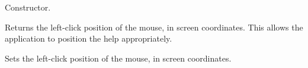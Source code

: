 \label{wxhelpeventctor}


Constructor.

\label{wxhelpeventgetposition}


Returns the left-click position of the mouse, in screen coordinates. This allows
the application to position the help appropriately.

\label{wxhelpeventsetposition}


Sets the left-click position of the mouse, in screen coordinates.

